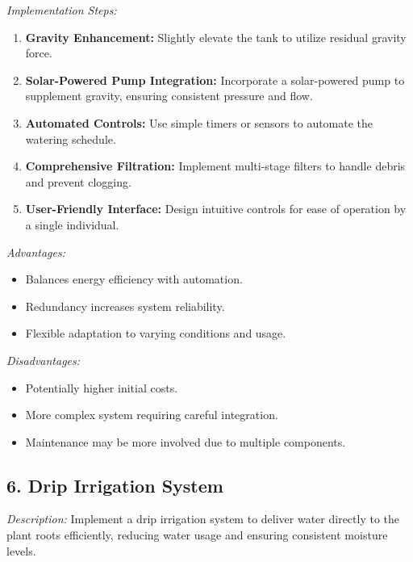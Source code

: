 \documentclass[12pt]{article}
\begin{document}
\noindent\textit{Implementation Steps:}
\begin{enumerate}[noitemsep, topsep=0pt]
\item \textbf{Gravity Enhancement:} Slightly elevate the tank to utilize residual gravity force.
\item \textbf{Solar-Powered Pump Integration:} Incorporate a solar-powered pump to supplement gravity, ensuring consistent pressure and flow.
\item \textbf{Automated Controls:} Use simple timers or sensors to automate the watering schedule.
\item \textbf{Comprehensive Filtration:} Implement multi-stage filters to handle debris and prevent clogging.
\item \textbf{User-Friendly Interface:} Design intuitive controls for ease of operation by a single individual.
\end{enumerate}

\noindent\textit{Advantages:}
\begin{itemize}[noitemsep, topsep=0pt]
\item Balances energy efficiency with automation.
\item Redundancy increases system reliability.
\item Flexible adaptation to varying conditions and usage.
\end{itemize}

\noindent\textit{Disadvantages:}
\begin{itemize}[noitemsep, topsep=0pt]
\item Potentially higher initial costs.
\item More complex system requiring careful integration.
\item Maintenance may be more involved due to multiple components.
\end{itemize}
\newpage
\subsection*{6. Drip Irrigation System}

\noindent\textit{Description:} Implement a drip irrigation system to deliver water directly to the plant roots efficiently, reducing water usage and ensuring consistent moisture levels.
\end{document}
